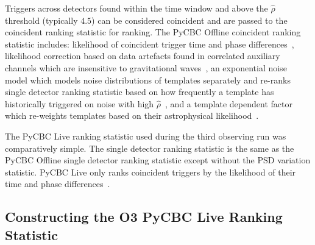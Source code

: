 Triggers across detectors found within the time window and above the $\hat{\rho}$ threshold (typically $4.5$) can be considered coincident and are passed to the coincident ranking statistic for ranking. The PyCBC Offline coincident ranking statistic includes: likelihood of coincident trigger time and phase differences~\cite{PyCBC:2016}, likelihood correction based on data artefacts found in correlated auxiliary channels which are insensitive to gravitational waves~\cite{DQ_vetoes:2017, iDQ:2020}, an exponential noise model which models noise distributions of templates separately and re-ranks single detector ranking statistic based on how frequently a template has historically triggered on noise with high $\hat{\rho}$~\cite{PyCBC:2017}, and a template dependent factor which re-weights templates based on their astrophysical likelihood~\cite{PyCBC_focussed_bbh:2024}.

The PyCBC Live ranking statistic used during the third observing run was comparatively simple. The single detector ranking statistic is the same as the PyCBC Offline single detector ranking statistic except without the PSD variation statistic. PyCBC Live only ranks coincident triggers by the likelihood of their time and phase differences~\cite{PyCBC_Live:2018}.

\subsection{\label{5:sec:old-stat-construction}Constructing the O3 PyCBC Live Ranking Statistic}

